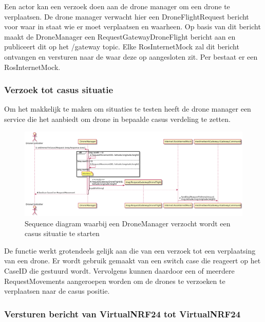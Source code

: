 \documentclass[a4paper, 11pt, oneside]{report}
\begin{document}
Een actor kan een verzoek doen aan de drone manager om een drone te verplaatsen.
De drone manager verwacht hier een DroneFlightRequest bericht voor waar in staat wie er moet verplaatsen en waarheen.
Op basis van dit bericht maakt de DroneManager een RequestGatewayDroneFlight bericht aan en publiceert dit op het /gateway topic.
Elke RosInternetMock zal dit bericht ontvangen en versturen naar de  waar deze op aangesloten zit.
Per  bestaat er een RosInternetMock.

\subsubsection{Verzoek tot casus situatie}
\label{DetailedDesign:ros:sequence:casus}

Om het makkelijk te maken om situaties te testen heeft de drone manager een service die het aanbiedt om drone in bepaalde casus verdeling te zetten.

\begin{figure}[H]
	\begin{center}\includegraphics[width=.95\linewidth]{UML/out/ros/sequence/CasusRequest/CasusRequest.png}\end{center}
	\caption{Sequence diagram waarbij een DroneManager verzocht wordt een casus situatie te starten}
	\label{fig:ros:sequence:sequence:casus}
\end{figure}

De functie werkt grotendeels gelijk aan die van een verzoek tot een verplaatsing van een drone. 
Er wordt gebruik gemaakt van een switch case die reageert op het CaseID die gestuurd wordt.
Vervolgens kunnen daardoor een of meerdere RequestMovements aangeroepen worden om de drones te verzoeken te verplaatsen naar de casus positie. 

\subsubsection{Versturen bericht van VirtualNRF24 tot VirtualNRF24}
\label{DetailedDesign:ros:sequence:sendmessage}
\end{document}
